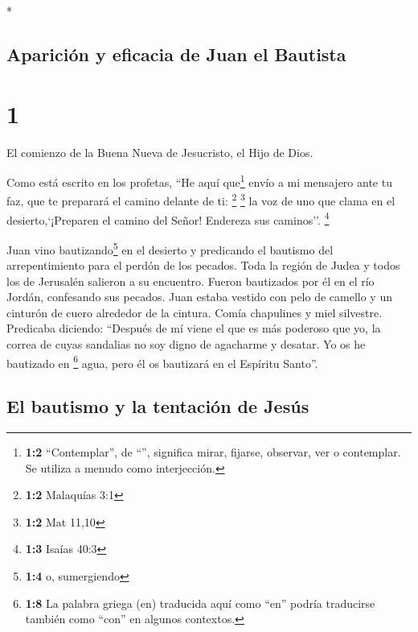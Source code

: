 \begin{paracol}{2} \switchcolumn[0]*

\hypertarget{apariciuxf3n-y-eficacia-de-juan-el-bautista}{%
\subsection{Aparición y eficacia de Juan el
Bautista}\label{apariciuxf3n-y-eficacia-de-juan-el-bautista}}

\hypertarget{section}{%
\section{1}\label{section}}

 El comienzo de la Buena Nueva de Jesucristo, el Hijo de
Dios.

 Como está escrito en los profetas, ``He aquí
que\footnote{\textbf{1:2} ``Contemplar'', de ``'', significa
  mirar, fijarse, observar, ver o contemplar. Se utiliza a menudo como
  interjección.} envío a mi mensajero ante tu faz, que te preparará el
camino delante de ti: \footnote{\textbf{1:2} Malaquías 3:1} \footnote{\textbf{1:2}
  Mat 11,10}  la voz de uno que clama en el
desierto,`¡Preparen el camino del Señor! Endereza sus caminos''.
\footnote{\textbf{1:3} Isaías 40:3}

 Juan vino bautizando\footnote{\textbf{1:4} o, sumergiendo}
en el desierto y predicando el bautismo del arrepentimiento para el
perdón de los pecados.  Toda la región de Judea y todos
los de Jerusalén salieron a su encuentro. Fueron bautizados por él en el
río Jordán, confesando sus pecados.  Juan estaba vestido
con pelo de camello y un cinturón de cuero alrededor de la cintura.
Comía chapulines y miel silvestre.  Predicaba diciendo:
``Después de mí viene el que es más poderoso que yo, la correa de cuyas
sandalias no soy digno de agacharme y desatar.  Yo os he
bautizado en \footnote{\textbf{1:8} La palabra griega (en) traducida
  aquí como ``en'' podría traducirse también como ``con'' en algunos
  contextos.} agua, pero él os bautizará en el Espíritu Santo''.

\hypertarget{el-bautismo-y-la-tentaciuxf3n-de-jesuxfas}{%
\subsection{El bautismo y la tentación de
Jesús}\label{el-bautismo-y-la-tentaciuxf3n-de-jesuxfas}}


\end{paracol}
